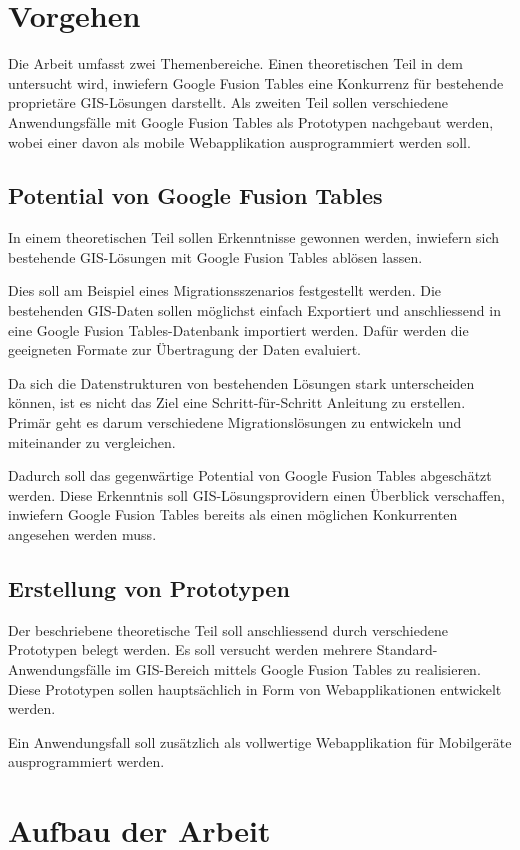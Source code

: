 \section{Vorgehen}
Die Arbeit umfasst zwei Themenbereiche. Einen theoretischen Teil in dem untersucht wird, inwiefern Google Fusion Tables eine Konkurrenz für bestehende proprietäre GIS-Lösungen darstellt. Als zweiten Teil sollen verschiedene Anwendungsfälle mit Google Fusion Tables als Prototypen nachgebaut werden, wobei einer davon als mobile Webapplikation ausprogrammiert werden soll.

\subsection{Potential von Google Fusion Tables}
In einem theoretischen Teil sollen Erkenntnisse gewonnen werden, inwiefern sich bestehende GIS-Lösungen mit Google Fusion Tables ablösen lassen.

Dies soll am Beispiel eines Migrationsszenarios festgestellt werden. Die bestehenden GIS-Daten sollen möglichst einfach Exportiert und anschliessend in eine Google Fusion Tables-Datenbank importiert werden. Dafür werden die geeigneten Formate zur Übertragung der Daten evaluiert.

Da sich die Datenstrukturen von bestehenden Lösungen stark unterscheiden können, ist es nicht das Ziel eine Schritt-für-Schritt Anleitung zu erstellen. Primär geht es darum verschiedene Migrationslösungen zu entwickeln und miteinander zu vergleichen.

Dadurch soll das gegenwärtige Potential von Google Fusion Tables abgeschätzt werden. Diese Erkenntnis soll GIS-Lösungsprovidern einen Überblick verschaffen, inwiefern Google Fusion Tables bereits als einen möglichen Konkurrenten angesehen werden muss.

\subsection{Erstellung von Prototypen}
Der beschriebene theoretische Teil soll anschliessend durch verschiedene Prototypen belegt werden. Es soll versucht werden mehrere Standard-Anwendungsfälle im GIS-Bereich mittels Google Fusion Tables zu realisieren. Diese Prototypen sollen hauptsächlich in Form von Webapplikationen entwickelt werden.

Ein Anwendungsfall soll zusätzlich als vollwertige Webapplikation für Mobilgeräte ausprogrammiert werden.

\section{Aufbau der Arbeit}

